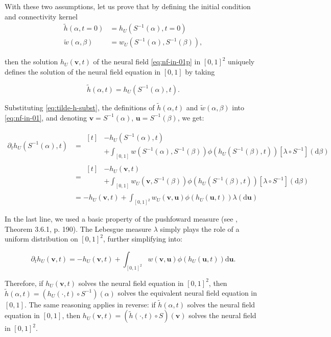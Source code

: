 \documentclass[10pt,letterpaper]{article}
\def\d{\mathrm d}
\renewcommand{\vec}[1]{\boldsymbol{#1}}
\begin{document}
With these two assumptions, let us prove that by defining the initial condition and connectivity kernel
$$
\begin{aligned}
\tilde h(\alpha, t=0) &= h_U(S^{-1}(\alpha), t=0)\\
\tilde w(\alpha, \beta) &= w_U(S^{-1}(\alpha), S^{-1}(\beta)),
\end{aligned}
$$

then the solution $h_U(\vec v, t)$ of the neural field \autoref{eq:nf-in-01p} in $[0,1]^2$ uniquely defines the solution of the neural field equation in $[0,1]$ by taking

\begin{equation} \label{eq:tilde-h-subst}
\tilde h(\alpha, t) = h_U(S^{-1}(\alpha), t).
\end{equation}

Substituting \autoref{eq:tilde-h-subst}, the definitions of $\tilde h(\alpha, t)$ and $\tilde w(\alpha, \beta)$ into \autoref{eq:nf-in-01}, and denoting $\vec{v} = S^{-1}(\alpha)$, $\vec{u} = S^{-1}(\beta)$, we get:

$$
\begin{aligned}
\partial_t h_U(S^{-1}(\alpha), t) &= 
\begin{aligned}[t]
	&-h_U(S^{-1}(\alpha), t)\\&+ \int_{[0,1]} w(S^{-1}(\alpha), S^{-1}(\beta)) \phi(h_U(S^{-1}(\beta), t)) \left[\lambda \circ S^{-1}\right](\d \beta)
\end{aligned}\\
&= \begin{aligned}[t]
	&-h_U(\vec v, t)\\&+ \int_{[0,1]} w_U(\vec v, S^{-1}(\beta)) \phi(h_U(S^{-1}(\beta), t)) \left[\lambda \circ S^{-1}\right](\d \beta)
\end{aligned}\\
&= -h_U(\vec v, t) + \int_{[0,1]^2} w_U(\vec v, \vec u) \phi(h_U(\vec u, t)) \lambda(\d \vec u)
\end{aligned}
$$

In the last line, we used a basic property of the pushfoward measure (see \cite{Bogachev2007}, Theorem 3.6.1, p. 190). The Lebesgue measure $\lambda$ simply plays the role of a uniform distribution on $[0,1]^2$, further simplifying into:

$$
\partial_t h_U(\vec v, t) = -h_U(\vec v, t) + \int_{[0,1]^2} w(\vec v, \vec u) \phi(h_U(\vec u, t)) \d \vec u.
$$

Therefore, if $h_U(\vec v, t)$ solves the neural field equation in $[0,1]^2$, then $\tilde h(\alpha, t) = (h_U(\cdot, t) \circ S^{-1})(\alpha)$ solves the equivalent neural field equation in $[0,1]$. The same reasoning applies in reverse: if $\tilde h(\alpha, t)$ solves the neural field equation in $[0,1]$, then $h_U(\vec v, t) = (\tilde h(\cdot, t) \circ S)(\vec v)$ solves the neural field in $[0,1]^2$.
\end{document}
